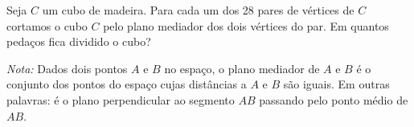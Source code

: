 Seja $C$ um cubo de madeira. Para cada um dos 28 pares de vértices de $C$ cortamos o cubo $C$ pelo plano mediador dos dois vértices do par. Em quantos pedaços fica dividido o cubo?

\textit{Nota:} Dados dois pontos $A$ e $B$ no espaço, o plano mediador de $A$ e $B$ é o conjunto dos pontos do espaço cujas distâncias a $A$ e $B$ são iguais.
Em outras palavras: é o plano perpendicular ao segmento $AB$ passando pelo ponto médio de $AB$.